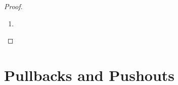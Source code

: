 \documentclass{book}
\begin{document}
\begin{proof}
\begin{enumerate}
\begin{enumerate}
\begin{itemize}
\begin{enumerate}
					\end{enumerate}
					Thus $(C,f) \in \Coeqzr_{\MC}(f,g)$. Since $(C,f) \in \Eqzr_{\op{\MC}}(f,g)$ is arbitrary, we have that for each $(C,f) \in \Eqzr_{\op{\MC}}(f,g)$, $(C,f) \in \Coeqzr_{\MC}(f,g)$. Thus $\Eqzr_{\op{\MC}}(f,g) \subset \Coeqzr_{\MC}(f,g)$.
					\item Similarly, $\Coeqzr_{\MC}(f,g) \subset \Eqzr_{\op{\MC}}(f,g)$. 
				\end{itemize}
				Since $\Eqzr_{\op{\MC}}(f,g) \subset \Coeqzr_{\MC}(f,g)$ and $\Coeqzr_{\MC}(f,g) \subset \Eqzr_{\op{\MC}}(f,g)$, we have that $\Eqzr_{\op{\MC}}(f,g) = \Coeqzr_{\MC}(f,g)$
				\item {}
			\end{enumerate}
			\item {}
		\end{enumerate}
	\end{proof}
	
	
	
	
	
	
	
	
	
	
	
	
	
	
	
	
	
	
	
	
	
	
	
	
	
	
	
	
	
	
	
	
	
	
	
	
	
	
	
	
	
	
	
	
	
	
	
	\newpage
	\section{Pullbacks and Pushouts}
	
	
	
	
	
	
	
	
	
	
	
	
	
	
	
	
	
\end{document}
